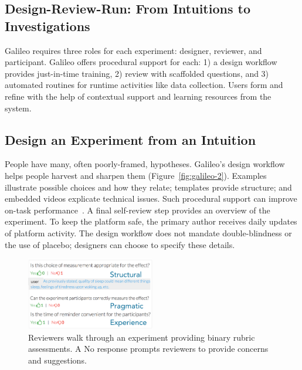 \subsection{Design-Review-Run: From Intuitions to Investigations}
Galileo requires three roles for each experiment: designer, reviewer, and participant. Galileo offers procedural support for each: 1) a design workflow provides just-in-time training, 2) review with scaffolded questions, and 3) automated routines for runtime activities like data collection. Users form and refine with the help of contextual support and learning resources from the system. 

\subsection{Design an Experiment from an Intuition}
People have many, often poorly-framed, hypotheses. Galileo's design workflow helps people harvest and sharpen them (Figure~\ref{fig:galileo-2}). Examples illustrate possible choices and how they relate; templates provide structure; and embedded videos explicate technical issues. Such procedural support can improve on-task performance~\cite{Pandey2018}. A final self-review step provides an overview of the experiment. To keep the platform safe, the primary author receives daily updates of platform activity. The design workflow does not mandate double-blindness or the use of placebo; designers can choose to specify these details.

\begin{figure}
  \centering
  \includegraphics[width=0.5\textwidth]{figures/galileo/galileo-2-review}
  \caption[Reviewers walk through an experiment providing binary rubric assessments]
{Reviewers walk through an experiment providing binary rubric assessments. A No response prompts reviewers to provide concerns and suggestions.}
  \label{fig:galileo-2-review}
\end{figure}

